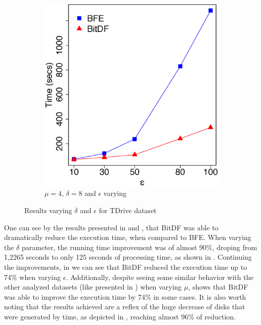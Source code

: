 \begin{figure}[h!]
\begin{subfigure}[t]{0.48\textwidth}
        \includegraphics[width=\textwidth]{images/TDrive_n_4_l_8_varying_g.eps}
        \caption{$\mu = 4$, $\delta = 8$ and $\epsilon$ varying}
        \label{fig:tdrive_vary_g}
    \end{subfigure}
    \caption{Results varying $\delta$ and $\epsilon$ for TDrive dataset}
    \label{fig:tdrive_results}
\end{figure}

One can see by the results presented in  and , that BitDF was
able to dramatically reduce the execution time, when compared to BFE. When varying the $\delta$ parameter, the running
time improvement was of almost 90\%, droping from 1,2265 seconds to only 125 seconds of processing time, as shown in
. Continuing the improvements, in  we can see that BitDF reduced the
execution time up to 74\% when varying $\epsilon$. Additionally, despite seeing some similar behavior with the other
analyzed datasets (like presented in ) when varying $\mu$,  shows that
BitDF was able to improve the execution time by 74\% in some cases. It is also worth noting that the results achieved
are a reflex of the huge decrease of disks that were generated by time, as depicted in ,
reaching almost 96\% of reduction.

